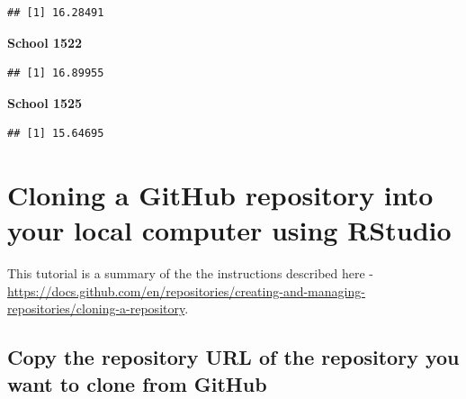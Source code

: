 \documentclass[
  12pt,
]{book}
\newenvironment{Shaded}{\begin{snugshade}}{\end{snugshade}}
\newcommand{\AttributeTok}[1]{\textcolor[rgb]{0.77,0.63,0.00}{#1}}
\newcommand{\DecValTok}[1]{\textcolor[rgb]{0.00,0.00,0.81}{#1}}
\newcommand{\FunctionTok}[1]{\textcolor[rgb]{0.00,0.00,0.00}{#1}}
\newcommand{\NormalTok}[1]{#1}
\newcommand{\SpecialCharTok}[1]{\textcolor[rgb]{0.00,0.00,0.00}{#1}}
\begin{document}
\begin{verbatim}
## [1] 16.28491
\end{verbatim}

\textbf{School 1522}

\begin{Shaded}
\end{Shaded}

\begin{verbatim}
## [1] 16.89955
\end{verbatim}

\textbf{School 1525}

\begin{Shaded}
\end{Shaded}

\begin{verbatim}
## [1] 15.64695
\end{verbatim}

\hypertarget{clone-repository}{%
\chapter{Cloning a GitHub repository into your local computer using RStudio}\label{clone-repository}}

This tutorial is a summary of the the instructions described here - \url{https://docs.github.com/en/repositories/creating-and-managing-repositories/cloning-a-repository}.

\hypertarget{copy-the-repository-url-of-the-repository-you-want-to-clone-from-github}{%
\section{Copy the repository URL of the repository you want to clone from GitHub}\label{copy-the-repository-url-of-the-repository-you-want-to-clone-from-github}}
\end{document}
